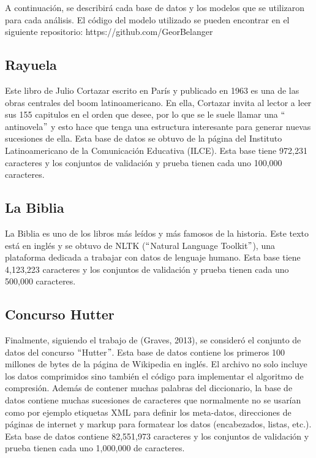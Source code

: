 A continuación, se describirá cada base de datos y los modelos que se utilizaron para cada análisis. El código del modelo utilizado se pueden encontrar en el siguiente repositorio: https://github.com/GeorBelanger

\subsection{Rayuela}
Este libro de Julio Cortazar escrito en París y publicado en 1963 es una de las obras centrales del boom latinoamericano. En ella, Cortazar invita al lector a leer sus 155 capitulos en el orden que desee, por lo que se le suele llamar una $``$antinovela$"$ y esto hace que tenga una estructura interesante para generar nuevas sucesiones de ella.
Esta base de datos se obtuvo de la página del Instituto Latinoamericano de la Comunicación Educativa (ILCE). Esta base tiene 972,231 caracteres y los conjuntos de validación y prueba tienen cada uno 100,000 caracteres.
\cite{rayuela}
\cite{cortazar}


\subsection{La Biblia}
La Biblia es uno de los libros más leídos y más famosos de la historia. Este texto está en inglés y se obtuvo de NLTK ($``$Natural Language Toolkit$"$), una plataforma dedicada a trabajar con datos de lenguaje humano. Esta base tiene 4,123,223 caracteres y los conjuntos de validación y prueba tienen cada uno 500,000 caracteres.
\cite{nltk}

\subsection{Concurso Hutter}
Finalmente, siguiendo el trabajo de (Graves, 2013), se consideró el conjunto de datos del concurso $``$Hutter$"$. Esta base de datos contiene los primeros 100 millones de bytes de la página de Wikipedia en inglés. El archivo no solo incluye los datos comprimidos sino también el código para implementar el algoritmo de compresión. Además de contener muchas palabras del diccionario, la base de datos contiene muchas sucesiones de caracteres que normalmente no se usarían como por ejemplo etiquetas XML para definir los meta-datos, direcciones de páginas de internet y markup para formatear los datos (encabezados, listas, etc.). Esta base de datos contiene 82,551,973 caracteres y los conjuntos de validación y prueba tienen cada uno 1,000,000 de caracteres.
\cite{DBLP:journals/corr/Graves13}



